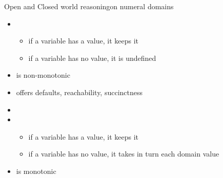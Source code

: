 \begin{frame}{Open and Closed world reasoning}{on numeral domains}
  \begin{itemize}
  \item<1-> 
    \begin{itemize}
    \item if a variable has a value,  it keeps it
    \item if a variable has no value, it is undefined
    \end{itemize}
  \item<only@3->[] is non-monotonic
  \item<only@4->[] offers defaults, reachability, succinctness
  \item<only@2-3>[]
  \item<2-> 
    \begin{itemize}
    \item if a variable has a value,  it keeps it
    \item if a variable has no value, it takes in turn each domain value
    \end{itemize}
  \item<only@3->[] is monotonic
  \end{itemize}
\end{frame}
%

